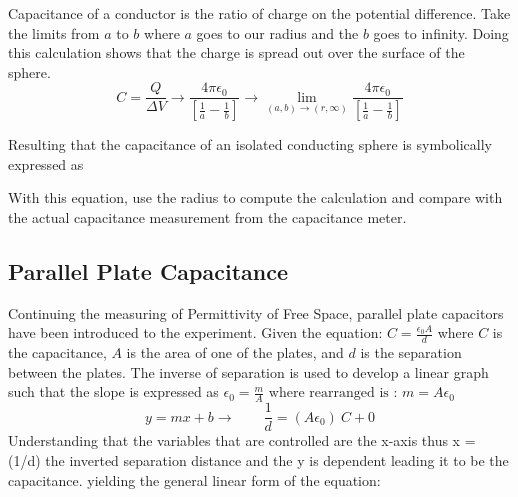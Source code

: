 \documentclass{article}
\begin{document}
Capacitance of a conductor is the ratio of charge on the potential difference. Take the limits from $a$ to $b$ where $a$ goes to our radius and the $b$ goes to infinity. Doing this calculation shows that the charge is spread out over the surface of the sphere. $$ C = \frac{Q}{\Delta V} \rightarrow \frac{4\pi \epsilon_{0}}{\left[ \frac{1}{a} - \frac{1}{b} \right]} \rightarrow \lim_{(a,b)\to(r,\infty)} \frac{4\pi \epsilon_{0}}{\left[ \frac{1}{a} - \frac{1}{b} \right]}$$ 
\vfill

\begin{center}
    Resulting that the capacitance of an isolated conducting sphere is symbolically expressed as 
\end{center}

With this equation, use the radius to compute the calculation and compare with the actual capacitance measurement from the  capacitance meter. 
\subsection*{Parallel Plate Capacitance}

Continuing the measuring of Permittivity of Free Space, parallel plate capacitors have been introduced to the experiment. Given the equation: $ C = \frac{\epsilon_{0} A} {d} $ where $C$ is the capacitance, $A$ is the area of one of the plates, and $d$ is the separation between the plates. The inverse of separation is used to develop a linear graph such that the slope  is expressed as $\epsilon_{0} = \frac{m}{A} \text{ where rearranged is : } m = A\epsilon_{0}$
$$ y = mx+b \rightarrow \qquad  \frac{1}{d}= (A\epsilon_{0}) \ C + 0 $$
Understanding that the variables that are controlled are the x-axis thus x = (1/d) the inverted separation distance and the y is dependent leading it to be the capacitance.
yielding the general linear form of the equation:
\begin{center}
\end{center}
\end{document}
